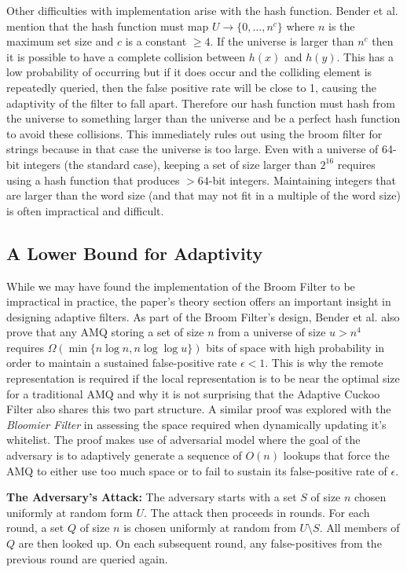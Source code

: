 \documentclass[../paper.tex]{subfiles}
\begin{document}
Other difficulties with implementation arise with the hash function. Bender et al.
mention that the hash function must map $U \rightarrow \{0,\ldots,n^c\}$ where
$n$ is the maximum set size and $c$ is a constant $\geq 4$. If the universe
is larger than $n^c$ then it is possible to have a complete collision between
$h(x)$ and $h(y)$. This has a low probability of occurring but if it does
occur and the colliding element is repeatedly queried, then the false positive
rate will be close to 1, causing the adaptivity of the filter to fall apart. Therefore
our hash function must hash from the universe to something larger than the universe
and be a perfect hash function to avoid these collisions. This immediately rules
out using the broom filter for strings because in that case the universe is too large.
Even with a universe of 64-bit integers (the standard case), keeping a set of size
larger than $2^{16}$ requires using a hash function that produces $>64$-bit integers.
Maintaining integers that are larger than the word size (and that may not fit in a multiple
of the word size) is often impractical and difficult.

\subsection{A Lower Bound for Adaptivity} While we may have found the
implementation of the Broom Filter to be impractical in practice, the paper's theory
section offers an important insight in designing adaptive filters. As part of the Broom Filter's design,
Bender et al. also prove that any AMQ storing a set of size $n$ from a universe
of size $u > n^4$ requires $\Omega (\min \{n\log n, n\log\log u\})$ bits of
space with high probability in order to maintain a sustained false-positive
rate $\epsilon < 1$.  This is why the remote representation is required if the
local representation is to be near the optimal size for a traditional AMQ and
why it is not surprising that the Adaptive Cuckoo Filter also shares this two
part structure.  A similar proof was explored with the {\it Bloomier Filter} 
\cite{bloomier-filter} in assessing the space required when dynamically 
updating it's whitelist. The proof makes use of adversarial model where the 
goal of the adversary is to adaptively generate a sequence of $O(n)$ lookups 
that force the AMQ to either use too much space or to fail to sustain its 
false-positive rate of $\epsilon$.  
	
	{\bf The Adversary's Attack:} The adversary starts with a set $S$ of size $n$ chosen
	uniformly at random form $U$.  The attack then proceeds in rounds.  For each round, 
	a set $Q$ of size $n$ is chosen uniformly at random from $U\setminus S$.  All members
	of $Q$ are then looked up. On each subsequent round, any false-positives from the 
	previous round are queried again. 
	
\end{document}
